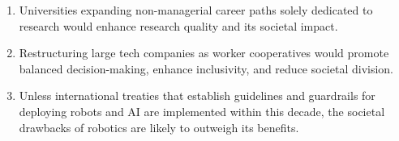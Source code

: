 \documentclass{propositions}
\begin{document}
\begin{enumerate}
    \item Universities expanding non-managerial career paths solely dedicated to research would enhance research quality and its societal impact.
    \item %
    Restructuring large tech companies as worker cooperatives would promote balanced decision-making, enhance inclusivity, and reduce societal division.
    \item %
    Unless international treaties that establish guidelines and guardrails for deploying robots and AI are implemented within this decade, the societal drawbacks of robotics are likely to outweigh its benefits. 
\end{enumerate}

\bigskip
\end{document}
